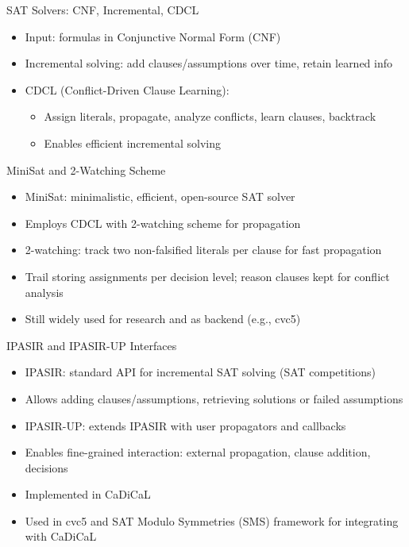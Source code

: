 \documentclass{beamer}
\begin{document}
\begin{frame}{SAT Solvers: CNF, Incremental, CDCL}
  \begin{itemize}
    \item Input: formulas in Conjunctive Normal Form (CNF)
    \item Incremental solving: add clauses/assumptions over time, retain learned info
    \item CDCL (Conflict-Driven Clause Learning):
    \begin{itemize}
      \item Assign literals, propagate, analyze conflicts, learn clauses, backtrack
      \item Enables efficient incremental solving
    \end{itemize}
  \end{itemize}
\end{frame}

\begin{frame}{MiniSat and 2-Watching Scheme}
  \begin{itemize}
    \item MiniSat: minimalistic, efficient, open-source SAT solver
    \item Employs CDCL with 2-watching scheme for propagation
    \item 2-watching: track two non-falsified literals per clause for fast propagation
    \item Trail storing assignments per decision level; reason clauses kept for conflict analysis
    \item Still widely used for research and as backend (e.g., cvc5)
  \end{itemize}
\end{frame}

\begin{frame}{IPASIR and IPASIR-UP Interfaces}
  \begin{itemize}
    \item IPASIR: standard API for incremental SAT solving (SAT competitions)
    \item Allows adding clauses/assumptions, retrieving solutions or failed assumptions
    \item IPASIR-UP: extends IPASIR with user propagators and callbacks
    \item Enables fine-grained interaction: external propagation, clause addition, decisions
    \item Implemented in CaDiCaL
    \item Used in cvc5 and SAT Modulo Symmetries (SMS) framework for integrating with CaDiCaL
  \end{itemize}
\end{frame}
\end{document}
